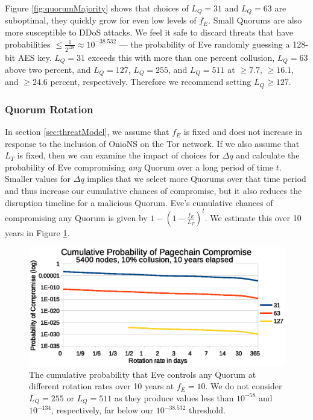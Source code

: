 \documentclass{sig-alternate}
\begin{document}
Figure \ref{fig:quorumMajority} shows that choices of $ L_{Q} = 31 $ and $ L_{Q} = 63 $ are suboptimal, they quickly grow for even low levels of $ f_{E} $. Small Quorums are also more susceptible to DDoS attacks. We feel it safe to discard threats that have probabilities $ \leq \frac{1}{2^{128}} \approx 10^{-38.532} $ --- the probability of Eve randomly guessing a 128-bit AES key. $ L_{Q} = 31 $ exceeds this with more than one percent collusion, $ L_{Q} = 63 $ above two percent, and $ L_{Q} = 127 $, $ L_{Q} = 255 $, and $ L_{Q} = 511 $ at $ \geq 7.7 $, $ \geq 16.1 $, and $ \geq 24.6 $ percent, respectively. Therefore we recommend setting $ L_{Q} \geq 127 $.

\subsubsection{Quorum Rotation}

In section \ref{sec:threatModel}, we assume that $ f_{E} $ is fixed and does not increase in response to the inclusion of OnioNS on the Tor network. If we also assume that $ L_{T} $ is fixed, then we can examine the impact of choices for $ \Delta q $ and calculate the probability of Eve compromising \emph{any} Quorum over a long period of time $ t $. Smaller values for $ \Delta q $ implies that we select more Quorums over that time period and thus increase our cumulative chances of compromise, but it also reduces the disruption timeline for a malicious Quorum. Eve's cumulative chances of compromising any Quorum is given by $ 1 - (1 - \frac{f_{E}}{L_{T}})^t $. We estimate this over 10 years in Figure \ref{fig:cumulativeProbability}. 

\begin{figure}[h]
	\centering
	\includegraphics[width=\linewidth]{../analysis/CumulativeMaliciousQuorum_tight.eps}
	\caption{The cumulative probability that Eve controls any Quorum at different rotation rates over 10 years at $ f_{E} = 10 $. We do not consider $ L_{Q} = 255 $ or $ L_{Q} = 511 $ as they produce values less than $ 10^{-58} $ and $ 10^{-134} $, respectively, far below our $ 10^{-38.532} $ threshold.}
	\label{fig:cumulativeProbability}
\end{figure}
\end{document}
